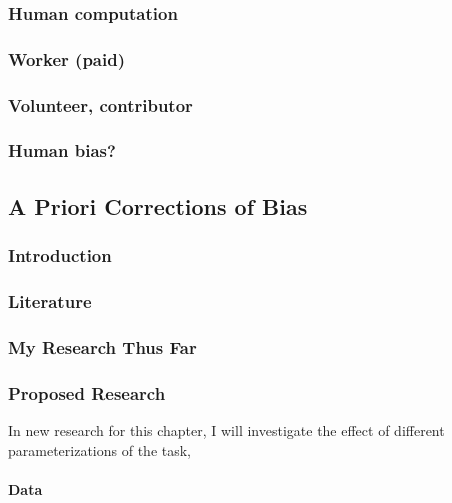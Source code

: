 \subsubsection{Human computation}\label{human-computation}

\subsubsection{Worker (paid)}\label{worker-paid}

\subsubsection{Volunteer, contributor}\label{volunteer-contributor}

\subsubsection{Human bias?}\label{human-bias}

\subsection{A Priori Corrections of
Bias}\label{a-priori-corrections-of-bias}

\subsubsection{Introduction}\label{introduction-2}

\subsubsection{Literature}\label{literature}

\subsubsection{My Research Thus Far}\label{my-research-thus-far}

\subsubsection{Proposed Research}\label{proposed-research}

In new research for this chapter, I will investigate the effect of
different parameterizations of the task,

\paragraph{Data}\label{data}

